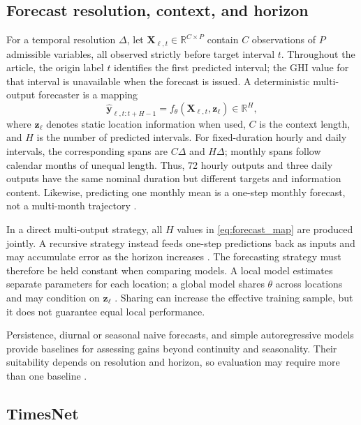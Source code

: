 \subsection{Forecast resolution, context, and horizon}

For a temporal resolution $\Delta$, let
$\mathbf{X}_{\ell,t}\in\mathbb{R}^{C\times P}$ contain $C$ observations of
$P$ admissible variables, all observed strictly before target interval $t$.
Throughout the article, the origin label $t$ identifies the first predicted
interval; the GHI value for that interval is unavailable when the forecast
is issued. A deterministic multi-output forecaster is a mapping
\begin{equation}
  \widehat{\mathbf{y}}_{\ell,t:t+H-1}
  =
  f_{\theta}\!\left(\mathbf{X}_{\ell,t},\mathbf{z}_{\ell}\right)
  \in\mathbb{R}^{H},
  \label{eq:forecast_map}
\end{equation}
where $\mathbf{z}_{\ell}$ denotes static location information when used,
$C$ is the context length, and $H$ is the number of predicted intervals.
For fixed-duration hourly and daily intervals, the corresponding spans are
$C\Delta$ and $H\Delta$; monthly spans follow calendar months of unequal length.
Thus, 72 hourly outputs and three daily outputs have the same nominal
duration but different targets and information content. Likewise, predicting
one monthly mean is a one-step monthly forecast, not a multi-month trajectory
\cite{diagne2013,yang2018}.

In a direct multi-output strategy, all $H$ values in
\eqref{eq:forecast_map} are produced jointly. A recursive strategy instead
feeds one-step predictions back as inputs and may accumulate error as the
horizon increases \cite{guariso2020}. The forecasting strategy must therefore
be held constant when comparing models. A local model estimates separate
parameters for each location; a global model shares $\theta$ across locations
and may condition on
$\mathbf{z}_{\ell}$ \cite{montero2021}. Sharing can increase the effective
training sample, but it does not guarantee equal local performance.

Persistence, diurnal or seasonal naive forecasts, and simple autoregressive
models provide baselines for assessing gains beyond continuity and
seasonality. Their suitability depends on resolution and horizon, so
evaluation may require more than one baseline \cite{voyant2022}.

\subsection{TimesNet}

